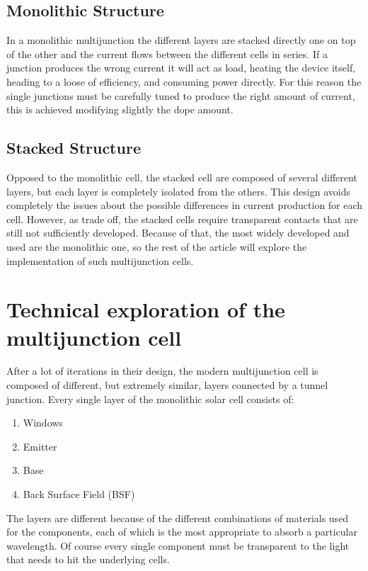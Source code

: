 \documentclass[11pt]{article} %
\begin{document}
\subsection{Monolithic Structure}

In a monolithic multijunction the different layers are stacked directly one on top of the other and the current flows between the different cells in series. If a junction produces the wrong current it will act as load, heating the device itself, heading to a loose of efficiency, and consuming power directly.  For this reason the single junctions must be carefully tuned to produce the right amount of current, this is achieved modifying slightly the dope amount.  

\subsection{Stacked Structure}

Opposed to the monolithic cell, the stacked cell are composed of several different layers, but each layer is completely isolated from the others.  This design avoids completely the issues about the possible differences in current production for each cell. However, as trade off, the stacked cells require transparent contacts that are still not sufficiently developed.  Because of that, the most widely developed and used are the monolithic one, so the rest of the article will explore the implementation of such multijunction cells.

\section{Technical exploration of the multijunction cell}

After a lot of iterations in their design, the modern multijunction cell is composed of different, but extremely similar, layers connected by a tunnel junction. Every single layer of the monolithic solar cell consists of:

\begin{enumerate}
	\item Windows 
	\item Emitter 
	\item Base 
	\item Back Surface Field (BSF) 
\end{enumerate}
The layers are different because of the different combinations of materials used for the components, each of which is the most appropriate to absorb a particular wavelength. Of course every single component must be transparent to the light that needs to hit the underlying cells. 
\end{document}

